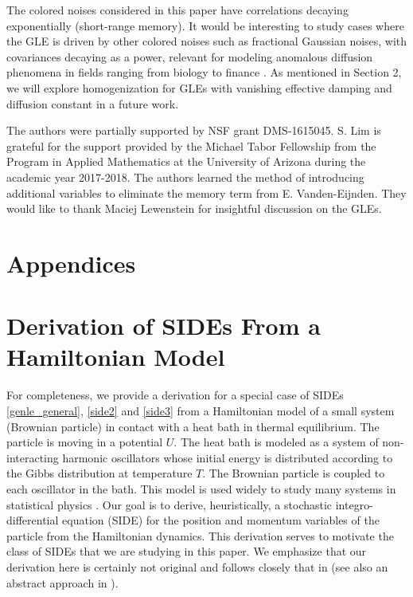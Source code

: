 The colored noises considered in this paper have correlations decaying exponentially (short-range memory). It would be interesting to study cases where the GLE is driven by other colored noises such as fractional Gaussian noises, with covariances decaying as a power,  relevant for modeling anomalous diffusion phenomena in fields ranging from biology to finance \cite{kou2008stochastic}. As mentioned in Section 2, we will explore homogenization for GLEs with vanishing effective damping and diffusion constant in a future work.   



\begin{acknowledgements}
The authors were partially supported by NSF grant DMS-1615045. S. Lim is grateful for the support provided by the Michael Tabor Fellowship from the Program in Applied Mathematics at the University of Arizona during the academic year 2017-2018. The authors learned the method of introducing additional variables to eliminate the memory term from E. Vanden-Eijnden. They would like to thank Maciej Lewenstein for insightful discussion on the GLEs.     
\end{acknowledgements}


%
%







\section*{Appendices}
\appendix
\section{Derivation of SIDEs From a Hamiltonian Model} \label{appA}

For completeness, we provide a derivation for a special case of SIDEs \eqref{genle_general}, \eqref{side2} and \eqref{side3} from a Hamiltonian model of a small system (Brownian particle) in contact with a heat bath in  thermal equilibrium.
The particle is moving in a potential $U$. The heat bath is modeled as a system of non-interacting harmonic oscillators whose initial energy is distributed according to the Gibbs distribution at temperature $T$. The Brownian particle is coupled to each oscillator in the bath. This model is used widely to study many systems in statistical physics \citep{ford1965statistical, mori1965transport}. Our goal  is to derive, heuristically, a stochastic integro-differential equation (SIDE) for the position and momentum variables of the particle from the Hamiltonian dynamics. This derivation serves to motivate the class of SIDEs that we are studying in this paper. We emphasize that our derivation here is certainly not original and follows closely that in \citep{hanggi1997generalized} (see also an abstract approach in \citep{Zwanzig1973}).  

